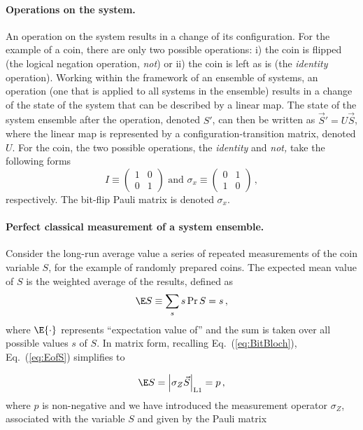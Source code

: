 \paragraph{Operations on the system. }

An operation on the system results in a change of its configuration.
For the example of a coin, there are only two possible operations:
i) the coin is flipped (the logical negation operation, \emph{not})
or ii) the coin is left as is (the \emph{identity} operation). Working
within the framework of an ensemble of systems, an operation (one
that is applied to all systems in the ensemble) results in a change
of the state of the system that can be described by a linear map.
The state of the system ensemble after the operation, denoted $S'$,
can then be written as $\vec{S}'=U\vec{S}$, where the linear map
is represented by a configuration-transition matrix, denoted $U$.
For the coin, the two possible operations, the \emph{identity} and
\emph{not,} take the following forms
\begin{equation}
I\equiv\begin{pmatrix}1 & 0\\
0 & 1
\end{pmatrix}\text{\ and\ }\sigma_{x}\equiv\begin{pmatrix}0 & 1\\
1 & 0
\end{pmatrix}\,,\label{eq:IandSigmaX}
\end{equation}
respectively. The bit-flip Pauli matrix is denoted $\sigma_{x}$.


\paragraph{Perfect classical measurement of a system ensemble.}

Consider the long-run average value a series of repeated measurements
of the coin variable $S$, for the example of randomly prepared coins.
The expected mean value of $S$ is the weighted average of the results,
defined as
\begin{equation}
\E S\equiv\sum_{s}s\Pr{S=s}\,,\label{eq:EofS}
\end{equation}
where $\E{\cdot}$ represents ``expectation value of'' and the sum
is taken over all possible values $s$ of $S$. In matrix form, recalling
Eq.~(\ref{eq:BitBloch}), Eq.~(\ref{eq:EofS}) simplifies to

\begin{equation}
\E S=\left|\sigma_{Z}\vec{S}\right|_{\mathrm{L1}}=p\,,\label{eq:ExpecL1}
\end{equation}
where $p$ is non-negative and we have introduced the measurement
operator $\sigma_{Z}$, associated with the variable $S$ and given
by the Pauli matrix

